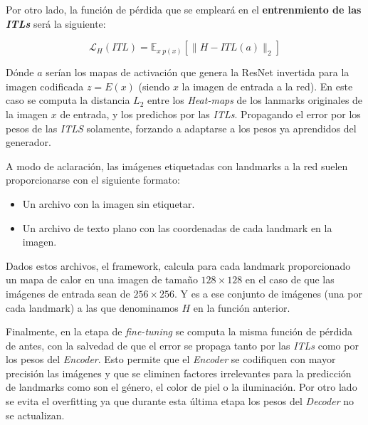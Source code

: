             \medskip

            \noindent Por otro lado, la función de pérdida que se empleará en el \textbf{entrenmiento de las \textit{ITLs}} será la siguiente: 

            \begin{equation} \label{eq::L2}
                \mathcal{L}_H(ITL) = \mathbb{E}_{x ~ p(x)} \left[ \| H-ITL(a)\|_2 \right]
            \end{equation}

            \noindent Dónde $a$ serían los mapas de activación que genera la ResNet invertida para la imagen codificada $z=E(x)$ (siendo $x$ la imagen de entrada a la red). En este caso se computa la distancia \textbf{$L_2$} entre los \textit{Heat-maps} de los lanmarks originales de la imagen $x$ de entrada, y los predichos por las \textit{ITLs}. Propagando el error por los pesos de las \textit{ITLS} solamente, forzando a adaptarse a los pesos ya aprendidos del generador.

            \medskip

            \noindent A modo de aclaración, las imágenes etiquetadas con landmarks a la red suelen proporcionarse con el siguiente formato: 

            \begin{itemize}
                \item Un archivo con la imagen sin etiquetar. 
                \item Un archivo de texto plano con las coordenadas de cada landmark en la imagen.
            \end{itemize}

            \noindent Dados estos archivos, el framework, calcula para cada landmark proporcionado un mapa de calor en una imagen de tamaño $128 \times 128$ en el caso de que las imágenes de entrada sean de $256 \times 256$. Y es a ese conjunto de imágenes (una por cada landmark) a las que denominamos $H$ en la función anterior.

            \medskip

            \noindent Finalmente, en la etapa de \textit{fine-tuning} se computa la misma función de pérdida de antes, con la salvedad de que el error se propaga tanto por las \textit{ITLs} como por los pesos del \textit{Encoder}. Esto permite que el \textit{Encoder} se codifiquen con mayor precisión las imágenes y que se eliminen factores irrelevantes para la predicción de landmarks como son el género, el color de piel o la iluminación. Por otro lado se evita el overfitting ya que durante esta última etapa los pesos del \textit{Decoder} no se actualizan.

